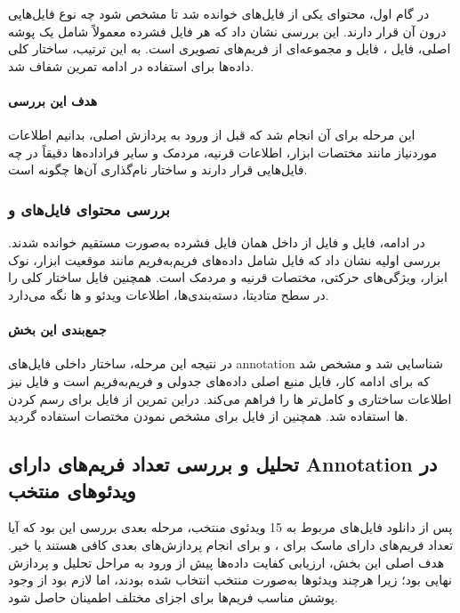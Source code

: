 \documentclass{article}
\begin{document}
در گام اول، محتوای یکی از فایل‌های  خوانده شد تا مشخص شود چه نوع فایل‌هایی درون آن قرار دارند. این بررسی نشان داد که هر فایل فشرده معمولاً شامل یک پوشه اصلی، فایل ، فایل  و مجموعه‌ای از فریم‌های تصویری است. به این ترتیب، ساختار کلی داده‌ها برای استفاده در ادامه تمرین شفاف شد.

\paragraph{هدف این بررسی}

این مرحله برای آن انجام شد که قبل از ورود به پردازش اصلی، بدانیم اطلاعات موردنیاز مانند مختصات ابزار، اطلاعات قرنیه، مردمک و سایر فراداده‌ها دقیقاً در چه فایل‌هایی قرار دارند و ساختار نام‌گذاری آن‌ها چگونه است.

\subsubsection{بررسی محتوای فایل‌های  و }

در ادامه، فایل  و فایل  از داخل همان فایل فشرده به‌صورت مستقیم خوانده شدند. بررسی اولیه نشان داد که فایل  شامل داده‌های فریم‌به‌فریم مانند موقعیت ابزار، نوک ابزار، ویژگی‌های حرکتی، مختصات قرنیه و مردمک است. همچنین فایل  ساختار کلی را در سطح متادیتا، دسته‌بندی‌ها، اطلاعات ویدئو و ها نگه می‌دارد.

\paragraph{جمع‌بندی این بخش}

در نتیجه این مرحله، ساختار داخلی فایل‌های annotation شناسایی شد و مشخص شد که برای ادامه کار، فایل  منبع اصلی داده‌های جدولی و فریم‌به‌فریم است و فایل  نیز اطلاعات ساختاری و کامل‌تر ها را فراهم می‌کند. دراین تمرین از فایل  برای رسم کردن ها استفاده شد. همچنین از فایل  برای مشخص نمودن مختصات  استفاده گردید.

\subsection{تحلیل و بررسی تعداد فریم‌های دارای Annotation در ویدئوهای منتخب}

پس از دانلود فایل‌های  مربوط به 15 ویدئوی منتخب، مرحله بعدی بررسی این بود که آیا تعداد فریم‌های دارای ماسک برای ،  و  برای انجام پردازش‌های بعدی کافی هستند یا خیر. هدف اصلی این بخش، ارزیابی کفایت داده‌ها پیش از ورود به مراحل تحلیل و پردازش نهایی بود؛ زیرا هرچند ویدئوها به‌صورت منتخب انتخاب شده بودند، اما لازم بود از وجود پوشش مناسب فریم‌ها برای اجزای مختلف اطمینان حاصل شود.
\end{document}
